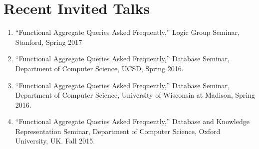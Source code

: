 \documentclass[10pt]{moderncv}
\begin{document}
{

}


\section{Recent Invited Talks}
\begin{enumerate}
 \item ``Functional Aggregate Queries Asked Frequently,''
         Logic Group Seminar, 
         Stanford, Spring 2017
 \item ``Functional Aggregate Queries Asked Frequently,''
         Database Seminar,
         Department of Computer Science, UCSD, Spring 2016.
 \item ``Functional Aggregate Queries Asked Frequently,''
         Database Seminar,
         Department of Computer Science, University of Wisconsin at Madison, Spring 2016.
 \item ``Functional Aggregate Queries Asked Frequently,''
         Database and Knowledge Representation Seminar,
         Department of Computer Science, Oxford University, UK. Fall 2015.
 \end{enumerate}
\end{document}
